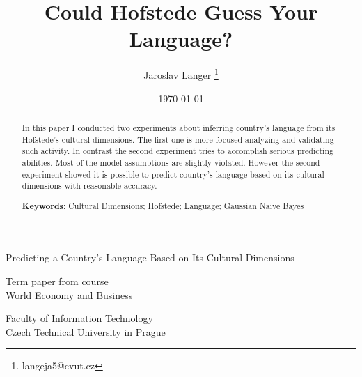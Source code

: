 \documentclass[a4paper,10pt]{article}
\title{Could Hofstede Guess Your Language?}
\date{\today}
\author{Jaroslav Langer \thanks{langeja5@cvut.cz}}
\begin{document}
\makeatletter
\begin{titlepage}
    \begin{center}
        \vspace*{1cm}
        \Huge{\textbf{\@title}}
        \vspace{0.5cm}

        \LARGE{Predicting a Country's Language Based on Its Cultural Dimensions}
        \vspace{1.5cm}

        \textbf{\@author}
        \@thanks
        \vfill
        Term paper from course\\
        World Economy and Business
        \vspace{0.8cm}

        \Large{Faculty of Information Technology\\
               Czech Technical University in Prague\\
               \@date}
    \end{center}
\end{titlepage}
\makeatother

\begin{abstract}
In this paper I conducted two experiments about inferring country's language from its Hofstede's cultural dimensions.
The first one is more focused analyzing and validating such activity.
In contrast the second experiment tries to accomplish serious predicting abilities.
Most of the model assumptions are slightly violated.
However the second experiment showed it is possible to predict country's language based on its cultural dimensions with reasonable accuracy.


\textbf{Keywords}: Cultural Dimensions; Hofstede; Language; Gaussian Naive Bayes
\end{abstract}
\end{document}
